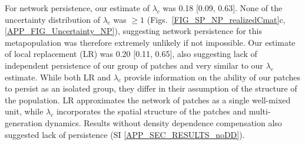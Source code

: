 \documentclass[12pt, oneside]{article}   	%
\begin{document}

For network persistence, our estimate of $\lambda_{c}$ was 0.18 [0.09, 0.63]. None of the uncertainty distribution of $\lambda_c$ was $\geq 1$ (Figs.\ \ref{FIG_SP_NP_realizedCmat}c, \ref{APP_FIG_Uncertainty_NP}), suggesting network persistence for this metapopulation was therefore extremely unlikely if not impossible. Our estimate of local replacement (LR) was 0.20 [0.11, 0.65], also suggesting lack of independent persistence of our group of patches and very similar to our $\lambda_{c}$ estimate. While both LR and $\lambda_{c}$ provide information on the ability of our patches to persist as an isolated group, they differ in their assumption of the structure of the population. LR approximates the network of patches as a single well-mixed unit, while $\lambda_{c}$ incorporates the spatial structure of the patches and multi-generation dynamics. Results without density dependence compensation also suggested lack of persistence (SI \ref{APP_SEC_RESULTS_noDD}).

\end{document}
